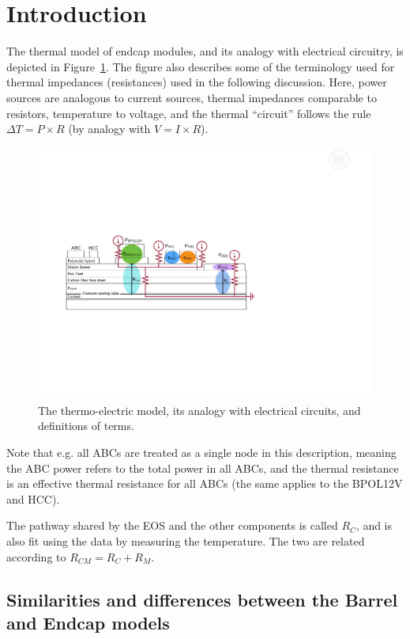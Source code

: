 
\section{Introduction}

The thermal model of endcap modules, and its analogy with electrical circuitry, is depicted in
Figure~\ref{thermoelectric_model}. The figure also describes some of the terminology used for thermal
impedances (resistances) used in the following discussion. Here, power sources are analogous to
current sources, thermal impedances comparable to resistors, temperature to voltage, and the thermal
``circuit'' follows the rule $\Delta T=P\times R$ (by analogy with $V=I\times R$).

\begin{figure}[ht!]
\begin{center}
\includegraphics[width=.80\textwidth]{figures/thermoelectric_model_bpol12v.pdf}
\end{center}
\caption{
The thermo-electric model, its analogy with electrical circuits, and definitions of terms.
}
\label{thermoelectric_model}
\end{figure}

Note that e.g. all ABCs are treated as a single node in this description, meaning the ABC power refers
to the total power in all ABCs, and the thermal resistance is an effective thermal resistance for all
ABCs (the same applies to the BPOL12V and HCC).

The pathway shared by the EOS and the other components is called $R_{C}$, and is also fit using the
data by measuring the temperature. The two are related according to $R_{CM} = R_C + R_M$.

\subsection{Similarities and differences between the Barrel and Endcap models}

